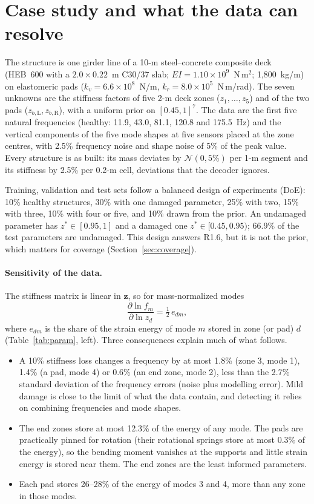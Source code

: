 \documentclass[11pt]{article}
\newcommand{\z}{\mathbf{z}}
\newcommand{\zb}[1]{z_{b,\mathrm{#1}}}
\begin{document}
\section{Case study and what the data can resolve}\label{sec:case}
The structure is one girder line of a 10-m steel--concrete composite deck (HEB~600 with a $2.0\times0.22$~m C30/37
slab; $EI=1.10\times10^{9}$~N\,m$^2$; 1,800~kg/m) on elastomeric pads ($k_v=6.6\times10^{8}$~N/m,
$k_r=8.0\times10^{5}$~N\,m/rad). The seven unknowns are the stiffness factors of five 2-m deck zones
($z_1,\dots,z_5$) and of the two pads ($\zb{L},\zb{R}$), with a uniform prior on $[0.45,1]^7$. The data are the first
five natural frequencies (healthy: 11.9, 43.0, 81.1, 120.8 and 175.5~Hz) and the vertical components of the five mode
shapes at five sensors placed at the zone centres, with 2.5\% frequency noise and shape noise of 5\% of the peak value.
Every structure is as built: its mass deviates by $\mathcal N(0,5\%)$ per 1-m segment and its stiffness by 2.5\% per
0.2-m cell, deviations that the decoder ignores.

Training, validation and test sets follow a balanced design of experiments (DoE): 10\% healthy structures, 30\% with
one damaged parameter, 25\% with two, 15\% with three, 10\% with four or five, and 10\% drawn from the prior. An
undamaged parameter has $z^*\in[0.95,1]$ and a damaged one $z^*\in[0.45,0.95)$; 66.9\% of the test parameters are
undamaged. This design answers R1.6, but it is not the prior, which matters for coverage (Section~\ref{sec:coverage}).

\paragraph{Sensitivity of the data.} The stiffness matrix is linear in $\z$, so for mass-normalized modes
\begin{equation}
\frac{\partial \ln f_m}{\partial \ln z_d}=\tfrac12\,e_{dm},
\end{equation}
where $e_{dm}$ is the share of the strain energy of mode $m$ stored in zone (or pad) $d$ (Table~\ref{tab:param},
left). Three consequences explain much of what follows.
\begin{itemize}
\item A 10\% stiffness loss changes a frequency by at most 1.8\% (zone 3, mode 1), 1.4\% (a pad, mode 4) or 0.6\%
(an end zone, mode 2), less than the 2.7\% standard deviation of the frequency errors (noise plus modelling error).
Mild damage is close to the limit of what the data contain, and detecting it relies on combining frequencies and mode
shapes.
\item The end zones store at most 12.3\% of the energy of any mode. The pads are practically pinned for rotation
(their rotational springs store at most 0.3\% of the energy), so the bending moment vanishes at the supports and
little strain energy is stored near them. The end zones are the least informed parameters.
\item Each pad stores 26--28\% of the energy of modes 3 and 4, more than any zone in those modes.
\end{itemize}
\end{document}
